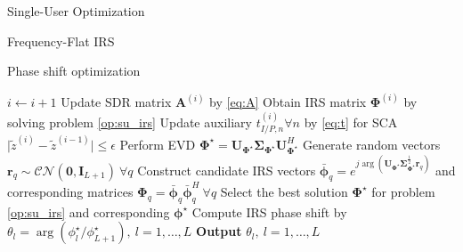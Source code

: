 \documentclass{IEEEtran}
\begin{document}
\begin{section}{Single-User Optimization}
\begin{subsection}{Frequency-Flat IRS}
\begin{subsubsection}{Phase shift optimization}
\begin{algorithm}
\begin{algorithmic}[1]
					\Repeat
					\State $i \leftarrow i + 1$
					\State Update SDR matrix $\boldsymbol{A}^{(i)}$ by \ref{eq:A}
					\State Obtain IRS matrix $\boldsymbol{\Phi}^{(i)}$ by solving problem \ref{op:su_irs}
					\State Update auxiliary $t_{I/P,n}^{(i)} \forall n$ by \ref{eq:t} for SCA
					\Until $\lvert \tilde{z}^{(i)}-\tilde{z}^{(i-1)} \rvert \le \epsilon$
					\State Perform EVD $\boldsymbol{\Phi}^{\star}=\boldsymbol{U}_{\boldsymbol{\Phi}^{\star}}\boldsymbol{\Sigma}_{\boldsymbol{\Phi}^{\star}}\boldsymbol{U}_{\boldsymbol{\Phi}^{\star}}^H$
					\State Generate random vectors $\boldsymbol{r}_q \sim \mathcal{CN}(\boldsymbol{0},\boldsymbol{I}_{L+1}) \ \forall q$
					\State Construct candidate IRS vectors $\bar{\boldsymbol{\phi}}_q=e^{j\arg\left(\boldsymbol{U}_{\boldsymbol{\Phi}^{\star}}\boldsymbol{\Sigma}_{\boldsymbol{\Phi}^{\star}}^{\frac{1}{2}}\boldsymbol{r}_q\right)}$ and corresponding matrices $\boldsymbol{\Phi}_q=\bar{\boldsymbol{\phi}}_q\bar{\boldsymbol{\phi}}_q^H  \ \forall q$
					\State Select the best solution $\boldsymbol{\Phi}^\star$ for problem \ref{op:su_irs} and corresponding $\boldsymbol{\phi}^\star$
					\State Compute IRS phase shift by $\theta_l=\arg(\phi_l^\star/\phi_{L+1}^\star), \ l=1,\dots,L$
					\State \textbf{Output} $\theta_l, \ l=1,\dots,L$
				\end{algorithmic}
			\end{algorithm}
		\end{subsubsection}


\end{subsection}
\end{section}
\end{document}
